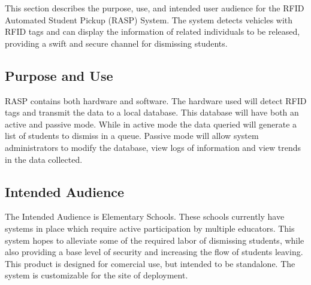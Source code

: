 \quad \quad This section describes the purpose, use, and intended user audience for the RFID 
Automated Student Pickup (RASP) System. The system detects vehicles with RFID tags and 
can display the information of related individuals to be released, providing a swift 
and secure channel for dismissing students.

\subsection{Purpose and Use}

\quad \quad RASP contains both hardware and software. The hardware used will detect RFID tags and 
transmit the data to a local database. This database will have both an active and 
passive mode. While in active mode the data queried will generate a list of students 
to dismiss in a queue. Passive mode will allow system administrators to modify the 
database, view logs of information and view trends in the data collected.

\subsection{Intended Audience}
\quad \quad The Intended Audience is Elementary Schools. These schools currently have 
systems in place which require active participation by multiple educators. This system 
hopes to alleviate some of the required labor of dismissing students, while also 
providing a base level of security and increasing the flow of students leaving. This 
product is designed for comercial use, but intended to be standalone. The system is 
customizable for the site of deployment.

